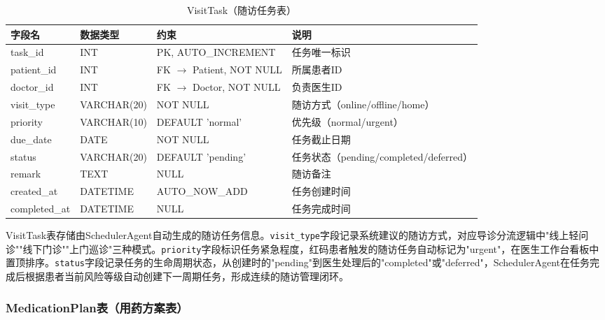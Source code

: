 \begin{table}[H]
\centering
\caption{VisitTask（随访任务表）}
\label{tab:table-visittask}
\begin{tabularx}{\textwidth}{|l|l|l|X|}
\hline
\textbf{字段名} & \textbf{数据类型} & \textbf{约束} & \textbf{说明} \\
\hline
task\_id & INT & PK, AUTO\_INCREMENT & 任务唯一标识 \\
\hline
patient\_id & INT & FK $\rightarrow$ Patient, NOT NULL & 所属患者ID \\
\hline
doctor\_id & INT & FK $\rightarrow$ Doctor, NOT NULL & 负责医生ID \\
\hline
visit\_type & VARCHAR(20) & NOT NULL & 随访方式（online/offline/home） \\
\hline
priority & VARCHAR(10) & DEFAULT 'normal' & 优先级（normal/urgent） \\
\hline
due\_date & DATE & NOT NULL & 任务截止日期 \\
\hline
status & VARCHAR(20) & DEFAULT 'pending' & 任务状态（pending/completed/deferred） \\
\hline
remark & TEXT & NULL & 随访备注 \\
\hline
created\_at & DATETIME & AUTO\_NOW\_ADD & 任务创建时间 \\
\hline
completed\_at & DATETIME & NULL & 任务完成时间 \\
\hline
\end{tabularx}
\end{table}

VisitTask表存储由SchedulerAgent自动生成的随访任务信息。\texttt{visit\_type}字段记录系统建议的随访方式，对应导诊分流逻辑中"线上轻问诊""线下门诊""上门巡诊"三种模式。\texttt{priority}字段标识任务紧急程度，红码患者触发的随访任务自动标记为"urgent"，在医生工作台看板中置顶排序。\texttt{status}字段记录任务的生命周期状态，从创建时的"pending"到医生处理后的"completed"或"deferred"，SchedulerAgent在任务完成后根据患者当前风险等级自动创建下一周期任务，形成连续的随访管理闭环。


\subsubsection{MedicationPlan表（用药方案表）}

